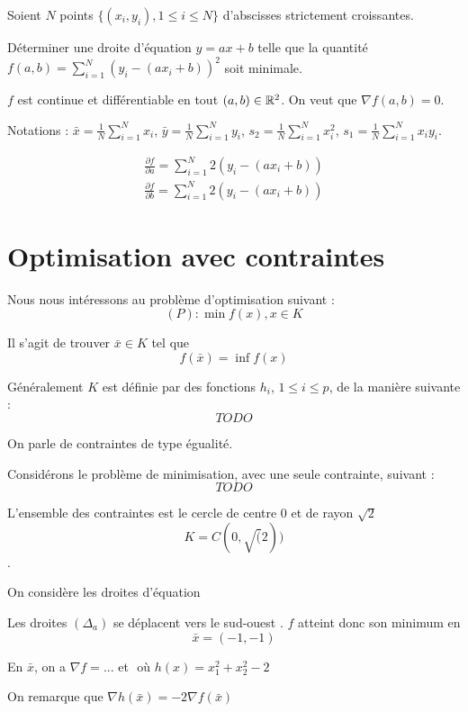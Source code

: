 		\begin{exemple}%
		
		Soient $N$ points $\{(x_i, y_i), 1\leq i \leq N\}$ d'abscisses strictement croissantes.
		
		Déterminer une droite d'équation $y=ax+b$ telle que la quantité $\displaystyle f(a, b) = \sum_{i=1}^N (y_i-(ax_i+b))^2$ soit minimale.
		
		$f$ est continue et différentiable en tout $(a, b) \in \mathbb{R}^2$.
		On veut que $\nabla f(a, b) = 0$.
		
		Notations :
		$\displaystyle \bar{x} = \frac{1}{N} \sum_{i=1}^N x_i$, 
		$\displaystyle \bar{y} = \frac{1}{N} \sum_{i=1}^N y_i$, 
		$\displaystyle s_2 = \frac{1}{N} \sum_{i=1}^N x_i^2$, 
		$\displaystyle s_1 = \frac{1}{N} \sum_{i=1}^N x_i y_i$.
		
		\begin{eqnarray*}%
 \frac{\partial f}{\partial a} = \sum_{i=1}^N 2(y_i-(ax_i+b)) \\ \frac{\partial f}{\partial b} = \sum_{i=1}^N 2(y_i-(ax_i+b)) \end{eqnarray*}

		\end{exemple}
		
		
\section{Optimisation avec contraintes}


Nous nous intéressons au problème d'optimisation suivant : \[ (P) : \min f(x), x \in K \]

Il s'agit de trouver $\bar{x} \in K$ tel que \[ f(\bar{x}) = \inf f(x) \]


Généralement $K$ est définie par des fonctions $h_i$, $1 \leq i \leq p$, de la manière suivante : \[ TODO \]

On parle de contraintes de type égualité.


\begin{exemple}
	Considérons le problème de minimisation, avec une seule contrainte, suivant : \[ TODO \]	
	
	L'ensemble des contraintes est le cercle de centre 0 et de rayon $\sqrt 2$ \[ K = C(0, \sqrt(2)) \].
	
	On considère les droites d'équation \[  \]
	
	Les droites $(\Delta_a)$ se déplacent vers le \og sud-ouest \fg. $f$ atteint donc son minimum en \[ \bar{x} = (-1, -1) \]
	
	En $\bar{x}$, on a $\displaystyle \nabla f = ...$ et $ $ où $h(x) = x_1^2 + x_2^2 - 2$
	
	On remarque que $ \nabla h( \bar{x} ) = -2  \nabla f( \bar{x} ) $
	
	
\end{exemple}


